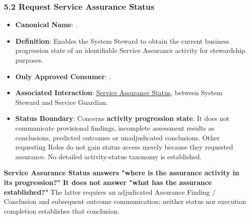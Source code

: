 \label{rad:assurance:175}
\subsubsection*{5.2 Request Service Assurance Status}
\label{rad:assurance:177}

\begin{itemize}

\item 
\textbf{Canonical Name}: \texttt{}.



\item 
\textbf{Definition}: Enables the System Steward to obtain the current business progression state of an identifiable Service Assurance activity for stewardship purposes.



\item 
\textbf{Only Approved Consumer}: \texttt{}.



\item 
\textbf{Associated Interaction}: \href{https://github.com/fhirfactory/harmonia/blob/98410db60155198a75f74c79d98060070209faa1/docs/markdown/03-business-architecture/collaborations-interactions/interactions.md\#service-assurance-status}{Service Assurance Status}, between System Steward and Service Guardian.



\item 
\textbf{Status Boundary}: Concerns \textbf{activity progression state}. It does not communicate provisional findings, incomplete assessment results as conclusions, predicted outcomes or unadjudicated conclusions. Other requesting Roles do not gain status access merely because they requested assurance. No detailed activity-status taxonomy is established.



\end{itemize}
\label{rad:assurance:183}

\textbf{Service Assurance Status answers "where is the assurance activity in its progression?" It does not answer "what has the assurance established?"} The latter requires an adjudicated Assurance Finding /\allowbreak{} Conclusion and subsequent outcome communication; neither status nor execution completion establishes that conclusion.

\label{rad:assurance:185}

